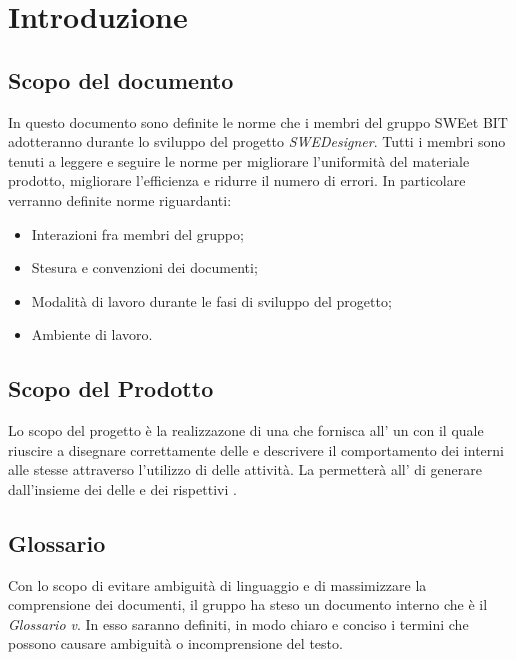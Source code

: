 \section{Introduzione}
  \subsection{Scopo del documento}
          In questo documento sono definite le norme che i membri del gruppo SWEet BIT adotteranno durante lo sviluppo del progetto \emph{SWEDesigner}.
          Tutti i membri sono tenuti a leggere e seguire le norme per migliorare l’uniformità del materiale prodotto, migliorare l’efficienza
          e ridurre il numero di errori.
          In particolare verranno definite norme riguardanti:
            \begin{itemize}
              \item Interazioni fra membri del gruppo;
              \item Stesura e convenzioni dei documenti;
              \item Modalità di lavoro durante le fasi di sviluppo del progetto;
              \item Ambiente di lavoro.
            \end{itemize}
  \subsection{Scopo del Prodotto}
          Lo scopo del progetto è la realizzazone di una  che fornisca all' un   con il quale riuscire a disegnare correttamente  delle 
          e descrivere il comportamento dei  interni alle stesse attraverso l'utilizzo di  delle attività.
          La  permetterà all' di generare   dall'insieme dei  delle  e dei rispettivi .
  \subsection{Glossario}
          Con lo scopo di evitare ambiguità di linguaggio e di massimizzare la comprensione dei documenti, il
          gruppo ha steso un documento interno che è il \emph{Glossario v}\VersioneG{}. In esso saranno definiti, in modo
          chiaro e conciso i termini che possono causare ambiguità o incomprensione del testo.
